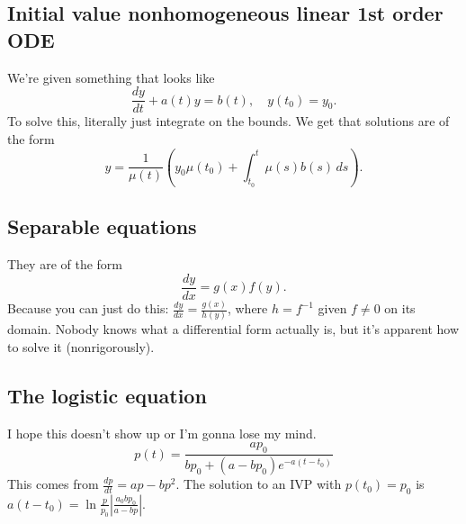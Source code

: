 \subsection{Initial value nonhomogeneous linear 1st order ODE}
We're given something that looks like 
\begin{equation}
    \frac{dy}{dt}+a(t)y=b(t),\quad y(t_0)=y_0.
\end{equation}
To solve this, literally just integrate on the bounds. We get that solutions are of the form \[
    y=\frac{1}{\mu(t)}\left( y_0\mu(t_0) +\int_{t_0}^{t} \mu(s)b(s) \, ds\right) .
\] 

\subsection{Separable equations}
They are of the form 
\begin{equation}
    \frac{dy}{dx}=g(x)f(y).
\end{equation}
Because you can just do this: $\frac{dy}{dx}=\frac{g(x)}{h(y)}$, where $h=f^{-1}$ given $f\neq 0$ on its domain. Nobody knows what a differential form actually is, but it's apparent how to solve it (nonrigorously).

\subsection{The logistic equation}
I hope this doesn't show up or I'm gonna lose my mind.
\begin{equation}
    p(t)=\frac{ap_0}{bp_0+(a-bp_0)e^{-a(t-t_0)}}
\end{equation} This comes from $\frac{dp}{dt}=ap-bp^2$. The solution to an IVP with $p(t_0)=p_0$ is $a(t-t_0)=\ln \frac{p}{p_0}\left| \frac{a_0bp_0}{a-bp} \right| $.
